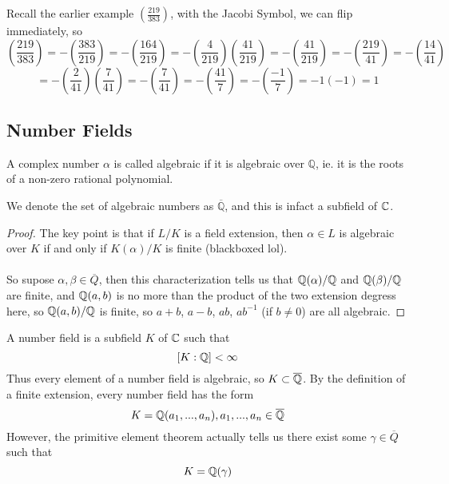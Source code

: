 \begin{example}
Recall the earlier example $(\frac{219}{383})$, with the Jacobi Symbol, we can flip immediately, so
\[(\frac{219}{383}) = -(\frac{383}{219}) = -(\frac{164}{219}) = -(\frac{4}{219})(\frac{41}{219}) = -(\frac{41}{219}) = -(\frac{219}{41}) = -(\frac{14}{41})\]
\[= -(\frac{2}{41})(\frac{7}{41}) = -(\frac{7}{41}) = -(\frac{41}{7}) = -(\frac{-1}{7}) = -1(-1) = 1\]
\end{example}

\subsection{Number Fields}

\begin{definition}
A complex number $\alpha$ is called algebraic if it is algebraic over $\mathbb{Q}$, ie. it is the roots of a non-zero rational polynomial.
\end{definition}

\begin{proposition}
We denote the set of algebraic numbers as $\overline{\mathbb{Q}}$, and this is infact a subfield of $\mathbb{C}$.
\end{proposition}

\begin{proof}
The key point is that if $L/K$ is a field extension, then $\alpha \in L$ is algebraic over $K$ if and only if $K(\alpha)/K$ is finite (blackboxed lol).\\\\
So supose $\alpha, \beta \in \overline{Q}$, then this characterization tells us that $\mathbb{Q}(\alpha)/\mathbb{Q}$ and $\mathbb{Q}(\beta)/\mathbb{Q}$ are finite, and $\mathbb{Q}(a, b)$ is no more than the product of the two extension degress here, so $\mathbb{Q}(a, b)/\mathbb{Q}$ is finite, so $a + b$, $a - b$, $ab$, $ab^{-1}$ (if $b \neq 0$) are all algebraic.
\end{proof}

\begin{definition}
A number field is a subfield $K$ of $\mathbb{C}$ such that
\[[K : \mathbb{Q}] < \infty\]
Thus every element of a number field is algebraic, so $K \subset \overline{\mathbb{Q}}$. By the definition of a finite extension, every number field has the form
\[K = \mathbb{Q}(a_1, ..., a_n), a_1, ..., a_n \in \overline{\mathbb{Q}}\]
However, the primitive element theorem actually tells us there exist some $\gamma \in \overline{Q}$ such that
\[K = \mathbb{Q}(\gamma)\]
\end{definition}

